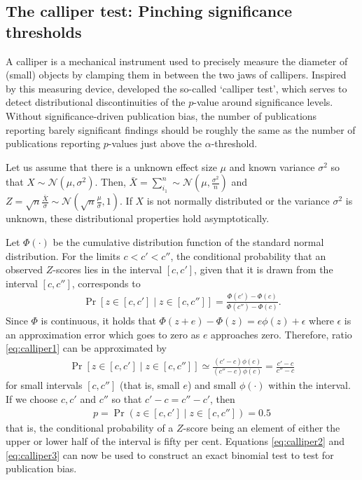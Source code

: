\subsection{The calliper test: Pinching significance thresholds}
A calliper is a mechanical instrument used to precisely measure the diameter of (small) objects by clamping them in between the two jaws of callipers. Inspired by this measuring device, \citet{gerber_can_2006, gerber_publication_2008} developed the so-called `calliper test', which serves to detect distributional discontinuities of the $p$-value around significance levels. Without significance-driven publication bias, the number of publications reporting barely significant findings should be roughly the same as the number of publications reporting $p$-values just above the $\alpha$-threshold. \par

Let us assume that there is a unknown effect size $\mu$ and known variance $\sigma^2$ so that ${X \sim \mathcal{N}(\mu,\sigma^2)}$. Then, ${\bar{X} = \sum_{i_1}^n \sim \mathcal{N}(\mu, \frac{\sigma^2}{n})}$ and ${Z = \sqrt{n}\frac{\bar{X}}{\sigma} \sim \mathcal{N}(\sqrt{n}\frac{\mu}{\sigma}, 1)}$. If $X$ is not normally distributed or the variance $\sigma^2$ is unknown, these distributional properties hold asymptotically.\par

Let $\Phi(\cdot)$ be the cumulative distribution function of the standard normal distribution. For the limits $c < c' < c''$, the conditional probability that an observed $Z$-scores lies in the interval $[c,c']$, given that it is drawn from the interval $[c, c'']$, corresponds to 
\begin{align}
    \Pr[z \in [c,c'] \mid z \in [c,c'']] = \frac{\Phi(c')-\Phi(c)}{\Phi(c'')-\Phi(c)}. \label{eq:calliper1}
\end{align}
Since $\Phi$ is continuous, it holds that $\Phi(z+e) - \Phi(z) = e\phi(z) + \epsilon$ where $\epsilon$ is an approximation error which goes to zero as $e$ approaches zero. Therefore, ratio \ref{eq:calliper1} can be approximated by
\begin{align}
    \Pr[z \in [c,c'] \mid z \in [c,c'']] \simeq \frac{(c'-c)\phi(c)}{(c''-c)\phi(c)} = \frac{c'-c
    }{c''-c} \label{eq:calliper2}
\end{align}
for small intervals $[c,c'']$ (that is, small $e$) and small $\phi(\cdot)$ within the interval. If we choose $c, c'$ and $c''$ so that ${c'- c = c''-c'}$, then 
\begin{align}
    p = \Pr(z \in [c,c'] \mid z \in [c,c'']) = 0.5 \label{eq:calliper3}
\end{align}
that is, the conditional probability of a $Z$-score being an element of either the upper or lower half of the interval is fifty per cent. Equations \ref{eq:calliper2} and \ref{eq:calliper3} can now be used to construct an exact binomial test to test for publication bias.\par


